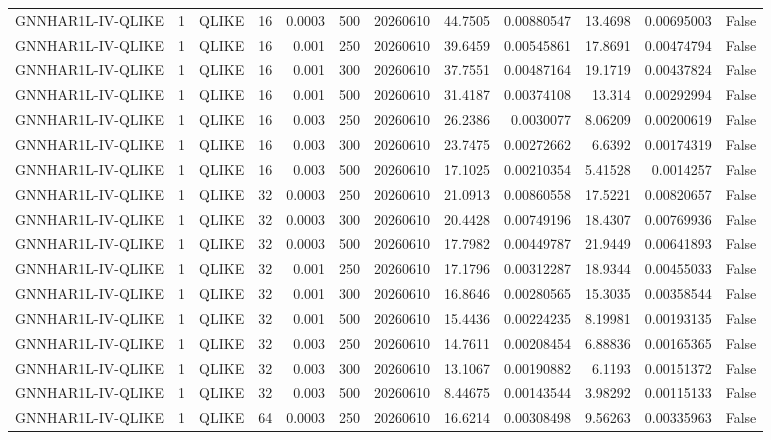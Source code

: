 \begin{tabular}{lrlrrrrrrrrr}
GNNHAR1L-IV-QLIKE & 1 & QLIKE & 16 & 0.0003 & 500 & 20260610 & 44.7505 & 0.00880547 & 13.4698 & 0.00695003 & False \\
GNNHAR1L-IV-QLIKE & 1 & QLIKE & 16 & 0.001 & 250 & 20260610 & 39.6459 & 0.00545861 & 17.8691 & 0.00474794 & False \\
GNNHAR1L-IV-QLIKE & 1 & QLIKE & 16 & 0.001 & 300 & 20260610 & 37.7551 & 0.00487164 & 19.1719 & 0.00437824 & False \\
GNNHAR1L-IV-QLIKE & 1 & QLIKE & 16 & 0.001 & 500 & 20260610 & 31.4187 & 0.00374108 & 13.314 & 0.00292994 & False \\
GNNHAR1L-IV-QLIKE & 1 & QLIKE & 16 & 0.003 & 250 & 20260610 & 26.2386 & 0.0030077 & 8.06209 & 0.00200619 & False \\
GNNHAR1L-IV-QLIKE & 1 & QLIKE & 16 & 0.003 & 300 & 20260610 & 23.7475 & 0.00272662 & 6.6392 & 0.00174319 & False \\
GNNHAR1L-IV-QLIKE & 1 & QLIKE & 16 & 0.003 & 500 & 20260610 & 17.1025 & 0.00210354 & 5.41528 & 0.0014257 & False \\
GNNHAR1L-IV-QLIKE & 1 & QLIKE & 32 & 0.0003 & 250 & 20260610 & 21.0913 & 0.00860558 & 17.5221 & 0.00820657 & False \\
GNNHAR1L-IV-QLIKE & 1 & QLIKE & 32 & 0.0003 & 300 & 20260610 & 20.4428 & 0.00749196 & 18.4307 & 0.00769936 & False \\
GNNHAR1L-IV-QLIKE & 1 & QLIKE & 32 & 0.0003 & 500 & 20260610 & 17.7982 & 0.00449787 & 21.9449 & 0.00641893 & False \\
GNNHAR1L-IV-QLIKE & 1 & QLIKE & 32 & 0.001 & 250 & 20260610 & 17.1796 & 0.00312287 & 18.9344 & 0.00455033 & False \\
GNNHAR1L-IV-QLIKE & 1 & QLIKE & 32 & 0.001 & 300 & 20260610 & 16.8646 & 0.00280565 & 15.3035 & 0.00358544 & False \\
GNNHAR1L-IV-QLIKE & 1 & QLIKE & 32 & 0.001 & 500 & 20260610 & 15.4436 & 0.00224235 & 8.19981 & 0.00193135 & False \\
GNNHAR1L-IV-QLIKE & 1 & QLIKE & 32 & 0.003 & 250 & 20260610 & 14.7611 & 0.00208454 & 6.88836 & 0.00165365 & False \\
GNNHAR1L-IV-QLIKE & 1 & QLIKE & 32 & 0.003 & 300 & 20260610 & 13.1067 & 0.00190882 & 6.1193 & 0.00151372 & False \\
GNNHAR1L-IV-QLIKE & 1 & QLIKE & 32 & 0.003 & 500 & 20260610 & 8.44675 & 0.00143544 & 3.98292 & 0.00115133 & False \\
GNNHAR1L-IV-QLIKE & 1 & QLIKE & 64 & 0.0003 & 250 & 20260610 & 16.6214 & 0.00308498 & 9.56263 & 0.00335963 & False \\

\end{tabular}
